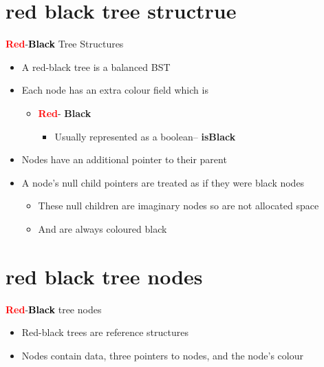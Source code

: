 \documentclass{beamer}
\begin{document}

\section*{red black tree structrue}
\begin{frame}{\textcolor{red} {\textbf{Red}}-\textcolor{black}{\textbf{Black}} Tree Structures}
    \begin{itemize}
        \item A red-black tree is a balanced BST
        \item Each node has an extra colour field which is
        \begin{itemize}
            \item \textcolor{red}{\textbf{Red}}- \textbf{Black}
            \begin{itemize}
                \item  Usually represented as a boolean– \textbf{isBlack}
            \end{itemize}
        \end{itemize}
        \item Nodes have an additional pointer to their parent
        \item  A node’s null child pointers are treated as if they 
were black nodes
\begin{itemize}
    \item These null children are imaginary nodes so are not 
allocated space
\item And are always coloured black
\end{itemize}
    \end{itemize}
\end{frame}

\section*{red black tree nodes}
\begin{frame}{\textcolor{red} {\textbf{Red}}-\textcolor{black}{\textbf{Black}} tree nodes}
    \begin{itemize}
    \item  Red-black trees are reference structures
    \item Nodes contain data, three pointers to nodes, and 
the node’s colour
\end{itemize}


\end{frame}
\end{document}
